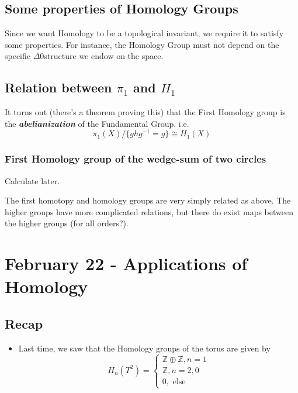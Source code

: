 \documentclass{article}
\begin{document}
\vskip 1cm
\subsection{Some properties of Homology Groups}

\vskip 0.5cm 
Since we want Homology to be a topological invariant, we require it to satisfy some properties. For instance, the Homology Group must not depend on the specific $\Delta$0structure we endow on the space.

\vskip 1cm 
\subsection*{Relation between $\pi_1$ and $H_1$}

It turns out (there's a theorem proving this) that the First Homology group is the \emph{\textbf{abelianization}} of the Fundamental Group. i.e.
\[ \pi_1(X) /\{ghg^{-1} = g\} \cong H_1(X) \]

\vskip 1cm 
\subsubsection*{First Homology group of the wedge-sum of two circles}
Calculate later.

\vskip 1cm 
The first homotopy and homology groups are very simply related as above. The higher groups have more complicated relations, but there do exist maps between the higher groups (for all orders?).

\pagebreak

\section{February 22 - Applications of Homology}

\vskip 0.5cm
\subsection*{Recap}
\begin{itemize}
  \item Last time, we saw that the Homology groups of the torus are given by 
  \[ H_n\left( T^2 \right) = \begin{cases}
    \mathbb{Z} \oplus \mathbb{Z}, n = 1 \\
    \mathbb{Z}, n = 2, 0 \\
    0, \text{ else}
  \end{cases} \]
\end{itemize}
\end{document}
